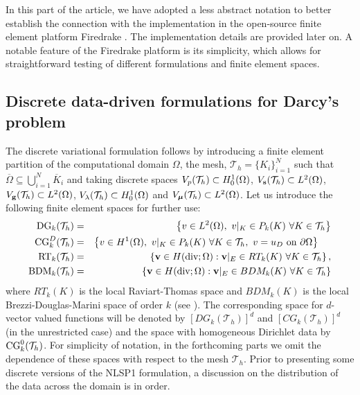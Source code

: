 \begin{remark}
In this part of the article, we have adopted a less abstract notation to better establish 
the connection with the implementation in the open-source finite element platform
Firedrake \cite{firedrake}. The implementation details are provided later on. 
A notable feature of the Firedrake platform is its simplicity, which allows
for straightforward testing of different formulations and finite element spaces.
\end{remark}

\subsection{Discrete data-driven formulations for Darcy's problem}

The discrete variational formulation follows by introducing a finite element partition of
the computational domain $\Omega$, the mesh, $\mathcal{T}_h = \{K_i\}_{i=1}^N$
such that $\overline{\Omega} \subseteq \bigcup_{i=1}^{N} \overline{K}_i$ and taking
discrete spaces
$V_{p}(\mathcal{T}_h) \subset H_0^1(\Omega)$, $V_{\mathbf{s}}(\mathcal{T}_h) \subset L^2(\Omega)$, $V_{\mathbf{g}}(\mathcal{T}_h) \subset L^2(\Omega)$, $V_{\lambda}(\mathcal{T}_h) \subset H_0^1(\Omega)$
and $V_{\boldsymbol{\mu}}(\mathcal{T}_h) \subset L^2(\Omega)$.
Let us introduce the following finite element spaces for further use:
\begin{eqnarray}
\text{DG}_k(\mathcal{T}_h) & = &  \left \{ v \in L^2(\Omega),~ v|_K \in P_k(K)~\forall K \in \mathcal{T}_h \right \}\\
\text{CG}_k^D(\mathcal{T}_h) & = &  \left \{ v \in H^1(\Omega),~ v|_K \in P_k(K)~\forall K \in \mathcal{T}_h,~v = u_D~\mbox{on}~\partial{\Omega} \right \}~~~~\\
\text{RT}_k(\mathcal{T}_h) & = & \left \{ \mathbf{v} \in H(\text{div};\Omega) : \mathbf{v} |_{E} \in RT_k (K)~\forall K \in \mathcal{T}_h \right \},\\
\text{BDM}_k(\mathcal{T}_h) &= & \left \{ \mathbf{v} \in H(\text{div};\Omega) : \mathbf{v} |_{E} \in BDM_k (K)~\forall K \in \mathcal{T}_h \right \}
\end{eqnarray}
where $RT_k(K)$ is the local Raviart-Thomas space and $BDM_k (K)$ 
is the local Brezzi-Douglas-Marini space of order $k$ (see \cite{RT,BDM}).
The corresponding space for $d$-vector valued functions will be
denoted by $[DG_k(\mathcal{T}_h)]^d$ and $[CG_k(\mathcal{T}_h)]^d$
(in the unrestricted case) and the space with homogeneous Dirichlet
data by $\text{CG}_k^0(\mathcal{T}_h)$. For simplicity of notation,
in the forthcoming parts we omit the dependence of these
spaces with respect to the mesh $\mathcal{T}_h$.
Prior to presenting some discrete versions of the NLSP1
formulation, a discussion on the distribution of the data across
the domain is in order.

